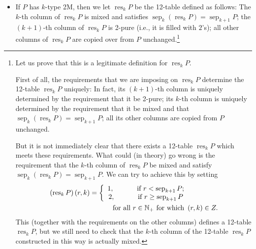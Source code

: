 \documentclass[numbers=enddot,12pt,final,onecolumn,notitlepage]{scrartcl}%
\theoremstyle{definition}
\newenvironment{verlong}{}{}
\begin{document}
\begin{verlong}
\begin{itemize}
\item If $P$ has $k$-type 2M, then we let $\operatorname*{res}_{k}P$ be the
12-table defined as follows: The $k$-th column of $\operatorname*{res}_{k}P$
is mixed and satisfies $\operatorname*{sep}\nolimits_{k}\left(
\operatorname*{res}\nolimits_{k}P\right)  =\operatorname*{sep}\nolimits_{k+1}%
P$; the $\left(  k+1\right)  $-th column of $\operatorname*{res}%
\nolimits_{k}P$ is 2-pure (i.e., it is filled with $2$'s); all other columns
of $\operatorname*{res}\nolimits_{k}P$ are copied over from $P$
unchanged.\footnote{
Let us prove that this is a legitimate definition for $\operatorname*{res}%
_{k}P$.

First of all, the requirements that we are imposing on $\operatorname*{res}%
_{k}P$ determine the 12-table $\operatorname*{res}_{k}P$ uniquely: In fact,
its $\left(  k+1\right)  $-th column is uniquely determined by the requirement
that it be 2-pure; its $k$-th column is uniquely determined by the requirement
that it be mixed and that $\operatorname*{sep}\nolimits_{k}\left(
\operatorname*{res}\nolimits_{k}P\right)  =\operatorname*{sep}\nolimits_{k+1}%
P$; all its other columns are copied from $P$ unchanged.

But it is not immediately clear that there exists a 12-table
$\operatorname*{res}\nolimits_{k}P$ which meets these requirements. What could
(in theory) go wrong is the requirement that the $k$-th column of
$\operatorname*{res}\nolimits_{k}P$ be mixed and satisfy $\operatorname*{sep}%
\nolimits_{k}\left(  \operatorname*{res}\nolimits_{k}P\right)
=\operatorname*{sep}\nolimits_{k+1}P$. We can try to achieve this by setting
\begin{align}
\left(  \operatorname*{res}\nolimits_{k}P\right)  \left(  r,k\right)   &
=\left\{
\begin{array}
[c]{c}%
1,\ \ \ \ \ \ \ \ \ \ \text{if }r<\operatorname*{sep}\nolimits_{k+1}P;\\
2,\ \ \ \ \ \ \ \ \ \ \text{if }r\geq\operatorname*{sep}\nolimits_{k+1}P
\end{array}
\right. \label{eq.def.res.check3}\\
&  \ \ \ \ \ \ \ \ \ \ \text{for all }r\in\mathbb{N}_{+}\text{ for which
}\left(  r,k\right)  \in Z.\nonumber
\end{align}
This (together with the requirements on the other columns) defines a 12-table
$\operatorname*{res}\nolimits_{k}P$, but we still need to check that the
$k$-th column of the 12-table $\operatorname*{res}\nolimits_{k}P$ constructed
in this way is actually mixed.

}
\end{itemize}
\end{verlong}
\end{document}
